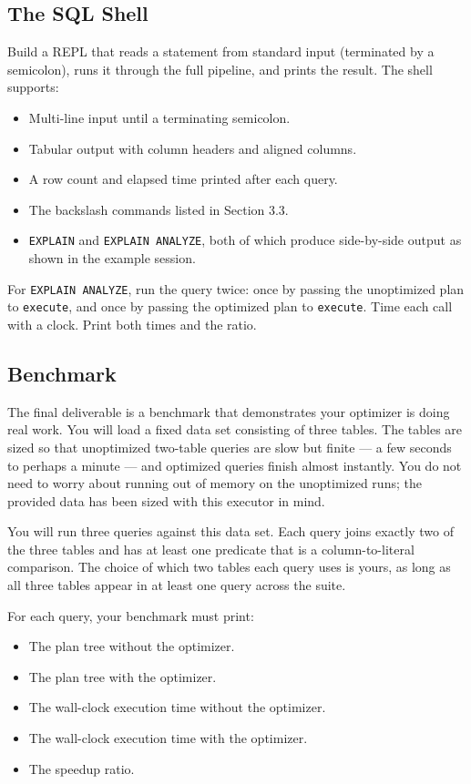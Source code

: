 \documentclass[11pt,a4paper]{article}
\begin{document}
\subsection{The SQL Shell}
Build a REPL that reads a statement from standard input (terminated by a semicolon), runs it through the full pipeline, and prints the result. The shell supports:

\begin{itemize}
\item Multi-line input until a terminating semicolon.
\item Tabular output with column headers and aligned columns.
\item A row count and elapsed time printed after each query.
\item The backslash commands listed in Section 3.3.
\item \texttt{EXPLAIN} and \texttt{EXPLAIN ANALYZE}, both of which produce side-by-side output as shown in the example session.
\end{itemize}

For \texttt{EXPLAIN ANALYZE}, run the query twice: once by passing the unoptimized plan to \texttt{execute}, and once by passing the optimized plan to \texttt{execute}. Time each call with a clock. Print both times and the ratio.

\subsection{Benchmark}
The final deliverable is a benchmark that demonstrates your optimizer is doing real work. You will load a fixed data set consisting of three tables. The tables are sized so that unoptimized two-table queries are slow but finite --- a few seconds to perhaps a minute --- and optimized queries finish almost instantly. You do not need to worry about running out of memory on the unoptimized runs; the provided data has been sized with this executor in mind.

You will run three queries against this data set. Each query joins exactly two of the three tables and has at least one predicate that is a column-to-literal comparison. The choice of which two tables each query uses is yours, as long as all three tables appear in at least one query across the suite.

For each query, your benchmark must print:
\begin{itemize}
\item The plan tree without the optimizer.
\item The plan tree with the optimizer.
\item The wall-clock execution time without the optimizer.
\item The wall-clock execution time with the optimizer.
\item The speedup ratio.
\end{itemize}
\end{document}

